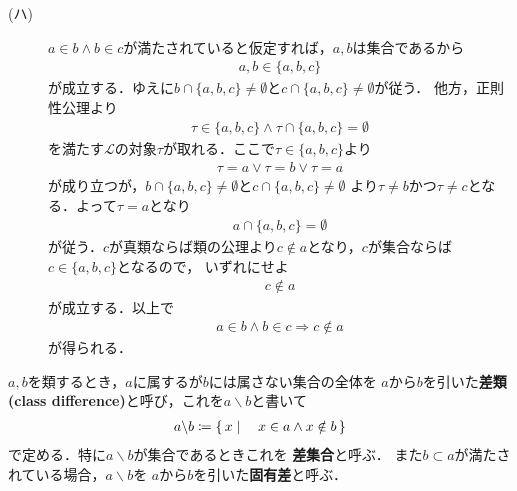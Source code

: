 \begin{prf}
\begin{description}
			\item[(ハ)]
				$a \in b \wedge b \in c$が満たされていると仮定すれば，$a,b$は集合であるから
				\begin{align}
					a,b \in \{a,b,c\}
				\end{align}
				が成立する．ゆえに$b \cap \{a,b,c\} \neq \emptyset$と$c \cap \{a,b,c\} \neq \emptyset$が従う．
				他方，正則性公理より
				\begin{align}
					\tau \in \{a,b,c\} \wedge \tau \cap \{a,b,c\} = \emptyset
				\end{align}
				を満たす$\mathcal{L}$の対象$\tau$が取れる．ここで$\tau \in \{a,b,c\}$より
				\begin{align}
					\tau = a \vee \tau = b \vee \tau = a
				\end{align}
				が成り立つが，$b \cap \{a,b,c\} \neq \emptyset$と$c \cap \{a,b,c\} \neq \emptyset$
				より$\tau \neq b$かつ$\tau \neq c$となる．よって$\tau = a$となり
				\begin{align}
					a \cap \{a,b,c\} = \emptyset
				\end{align}
				が従う．$c$が真類ならば類の公理より$c \notin a$となり，$c$が集合ならば$c \in \{a,b,c\}$となるので，
				いずれにせよ
				\begin{align}
					c \notin a
				\end{align}
				が成立する．以上で
				\begin{align}
					a \in b \wedge b \in c \Longrightarrow c \notin a
				\end{align}
				が得られる．
				\QED
		\end{description}
	\end{prf}
	
	\begin{screen}
		\begin{dfn}[差類]
			$a,b$を類するとき，$a$に属するが$b$には属さない集合の全体を
			$a$から$b$を引いた{\bf 差類}
			{\bf (class difference)}と呼び，これを$a \backslash b$と書いて
			\begin{align}
				a \backslash b \coloneqq \left\{\, x \mid \quad x \in a \wedge x \notin b\, \right\}
			\end{align}
			で定める．特に$a \backslash b$が集合であるときこれを
			{\bf 差集合}と呼ぶ．
			また$b \subset a$が満たされている場合，$a \backslash b$を
			$a$から$b$を引いた{\bf 固有差}と呼ぶ．
		\end{dfn}
	\end{screen}
	
